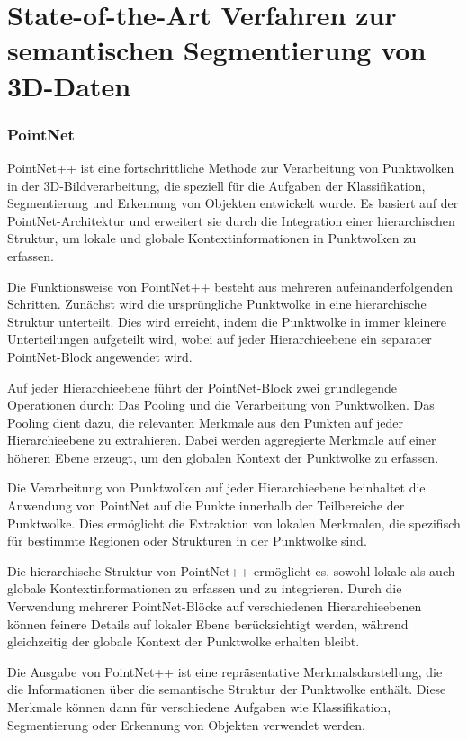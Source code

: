 \chapter{State-of-the-Art Verfahren zur semantischen Segmentierung von 3D-Daten}
\subsection{PointNet}
PointNet++ ist eine fortschrittliche Methode zur Verarbeitung von Punktwolken
in der 3D-Bildverarbeitung, die speziell für die Aufgaben der Klassifikation,
Segmentierung und Erkennung von Objekten entwickelt wurde. Es basiert auf der
PointNet-Architektur und erweitert sie durch die Integration einer
hierarchischen Struktur, um lokale und globale Kontextinformationen in
Punktwolken zu erfassen.

Die Funktionsweise von PointNet++ besteht aus mehreren aufeinanderfolgenden
Schritten. Zunächst wird die ursprüngliche Punktwolke in eine hierarchische
Struktur unterteilt. Dies wird erreicht, indem die Punktwolke in immer kleinere
Unterteilungen aufgeteilt wird, wobei auf jeder Hierarchieebene ein separater
PointNet-Block angewendet wird.

Auf jeder Hierarchieebene führt der PointNet-Block zwei grundlegende
Operationen durch: Das Pooling und die Verarbeitung von Punktwolken. Das
Pooling dient dazu, die relevanten Merkmale aus den Punkten auf jeder
Hierarchieebene zu extrahieren. Dabei werden aggregierte Merkmale auf einer
höheren Ebene erzeugt, um den globalen Kontext der Punktwolke zu erfassen.

Die Verarbeitung von Punktwolken auf jeder Hierarchieebene beinhaltet die
Anwendung von PointNet auf die Punkte innerhalb der Teilbereiche der
Punktwolke. Dies ermöglicht die Extraktion von lokalen Merkmalen, die
spezifisch für bestimmte Regionen oder Strukturen in der Punktwolke sind.

Die hierarchische Struktur von PointNet++ ermöglicht es, sowohl lokale als auch
globale Kontextinformationen zu erfassen und zu integrieren. Durch die
Verwendung mehrerer PointNet-Blöcke auf verschiedenen Hierarchieebenen können
feinere Details auf lokaler Ebene berücksichtigt werden, während gleichzeitig
der globale Kontext der Punktwolke erhalten bleibt.

Die Ausgabe von PointNet++ ist eine repräsentative Merkmalsdarstellung, die die
Informationen über die semantische Struktur der Punktwolke enthält. Diese
Merkmale können dann für verschiedene Aufgaben wie Klassifikation,
Segmentierung oder Erkennung von Objekten verwendet werden.

